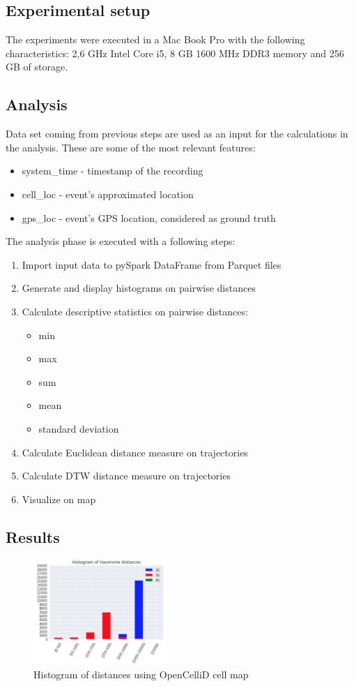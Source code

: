 \subsection{Experimental setup}
The experiments were executed in a Mac Book Pro with the following characteristics: 2,6 GHz Intel Core i5, 8 GB 1600 MHz DDR3 memory and 256 GB of storage.

\subsection{Analysis}
Data set coming from previous steps are used as an input for the calculations in the analysis. These are some of the most relevant features:
\begin{itemize}
    \item system\_time - timestamp of the recording
    \item cell\_loc - event's approximated location
    \item gps\_loc - event's GPS location, considered as ground truth
\end{itemize}

The analysis phase is executed with a following steps:
\begin{enumerate}
    \item Import input data to pySpark DataFrame from Parquet files
    \item Generate and display histograms on pairwise distances
    \item Calculate descriptive statistics on pairwise distances:
        \begin{itemize}
            \item min
            \item max
            \item sum
            \item mean
            \item standard deviation
        \end{itemize}
    \item Calculate Euclidean distance measure on trajectories
    \item Calculate DTW distance measure on trajectories
    \item Visualize on map
\end{enumerate}

\subsection{Results}
\begin{figure}[h!]
    \centering
    \includegraphics[width=0.45\textwidth]{images/histogram.png}
    \caption{Histogram of distances using OpenCelliD cell map}
    \label{fig:hist_opencell}
\end{figure}

